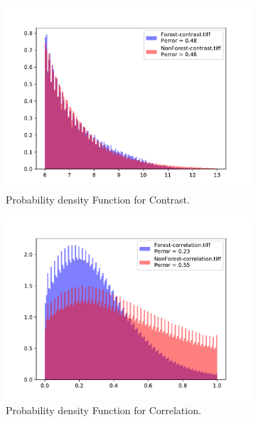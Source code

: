 \begin{figure}[H]
\begin{subfigure}[b]{0.4\linewidth}
    \includegraphics[width=\linewidth]{Chapter5/SENTINEL1/Coherence/contrast_histogram.pdf}
     \caption{Probability density Function for Contrast.}
  \end{subfigure}
  \centering
  \begin{subfigure}[b]{0.4\linewidth}
    \includegraphics[width=\linewidth]{Chapter5/SENTINEL1/Coherence/correlation_histogram.pdf}
     \caption{Probability density Function for Correlation.}
  \end{subfigure}
  \centering
  \begin{subfigure}[b]{0.4\linewidth}

\end{subfigure}
\end{figure}
